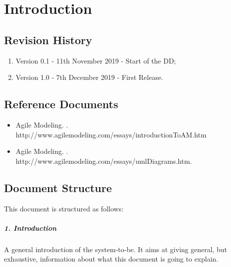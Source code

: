 \documentclass[../DD.tex]{subfiles}
\begin{document}
\chapter{Introduction}
\thispagestyle{fancy}
		
		
		
		
		\section{Revision History}
		\begin{enumerate}
			\item Version 0.1 - 11th November 2019 - Start of the DD;
			
			\item Version 1.0 - 7th December 2019 - First Release.
			
		\end{enumerate}
		\section{Reference Documents}
		\begin{itemize}
			\item Agile Modeling. . \\ http://www.agilemodeling.com/essays/introductionToAM.htm
			\item Agile Modeling. . \\ http://www.agilemodeling.com/essays/umlDiagrams.htm.
		\end{itemize}
		\section{Document Structure}
		This document is structured as follows:
		\paragraph{1. Introduction}
		A general introduction of the system-to-be. It aims at giving general, but exhaustive, information about what this document is going to explain.
\end{document}
